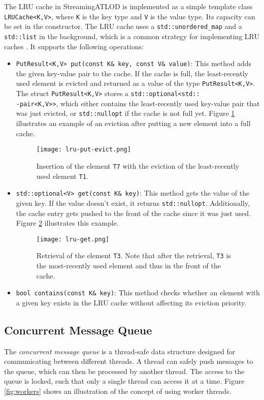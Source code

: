 The LRU cache in StreamingATLOD is implemented as a simple template class \texttt{LRUCache<K,V>},
where \texttt{K} is the key type and \texttt{V} is the value type.
Its capacity can be set in the constructor.
The LRU cache uses a \texttt{std::unordered\_map} and a \texttt{std::list} in the background,
which is a common strategy for implementing LRU caches \cite{redislru}.
It supports the following operations:
\begin{itemize}
  \item \texttt{PutResult<K,V> put(const K\& key, const V\& value)}: This method adds the given key-value pair to the cache.
  If the cache is full, the least-recently used element is evicted and returned as a value of the type \texttt{PutResult<K,V>}.
  The struct \texttt{PutResult<K,V>} stores a \texttt{std::optional<std::}\\ \texttt{-pair<K,V>>}, which either contains the least-recently used key-value pair that was just evicted,
  or \texttt{std::nullopt} if the cache is not full yet. Figure \ref{fig:lru-put-evict} illustrates an example of an eviction after putting a new element into a full cache.
  \begin{figure}[H]
    \centering  
    \texttt{[image: lru-put-evict.png]}
    \caption{Insertion of the element \texttt{T7} with the eviction of the least-recently used element \texttt{T1}.}\label{fig:lru-put-evict}
  \end{figure}
  \item \texttt{std::optional<V> get(const K\& key)}: This method gets the value of the given key. If the value doesn't exist, 
        it returns \texttt{std::nullopt}. Additionally, the cache entry gets pushed to the front of the cache since it was just used.
        Figure \ref{fig:lru-get} illustrates this example.
        \begin{figure}[H]
          \centering  
          \texttt{[image: lru-get.png]}
          \caption{Retrieval of the element \texttt{T3}. Note that after the retrieval, \texttt{T3} is the most-recently used element and thus in the front of the cache.}\label{fig:lru-get}
        \end{figure}
  \item \texttt{bool contains(const K\& key)}: This method checks whether an element with a given key exists in the LRU cache without affecting its eviction priority.
\end{itemize}

\subsection{Concurrent Message Queue}
The \textit{concurrent message queue} is a thread-safe data structure designed 
for communicating between different threads. A thread can safely 
push messages to the queue, which can then be processed by another thread.
The access to the queue is locked, such that only a single thread can 
access it at a time. Figure \ref{fig:workers} shows an illustration 
of the concept of using worker threads.

